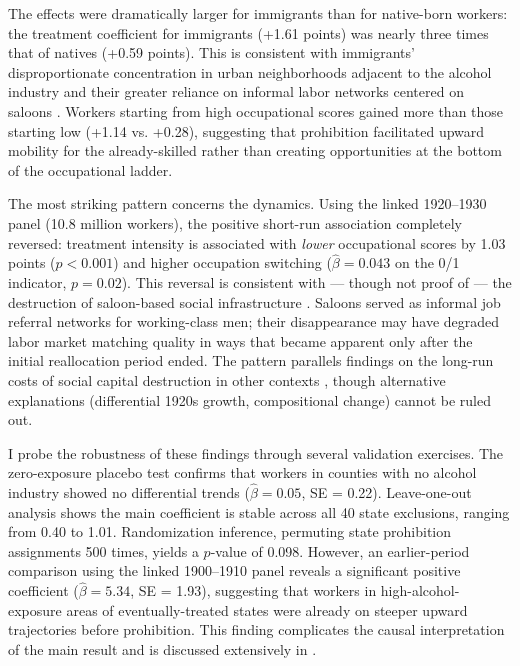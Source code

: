 \documentclass[12pt]{article}
\begin{document}
The effects were dramatically larger for immigrants than for native-born workers: the treatment coefficient for immigrants (+1.61 points) was nearly three times that of natives (+0.59 points). This is consistent with immigrants' disproportionate concentration in urban neighborhoods adjacent to the alcohol industry \citep{abramitzky2014} and their greater reliance on informal labor networks centered on saloons \citep{powers1998}. Workers starting from high occupational scores gained more than those starting low (+1.14 vs. +0.28), suggesting that prohibition facilitated upward mobility for the already-skilled rather than creating opportunities at the bottom of the occupational ladder.

The most striking pattern concerns the dynamics. Using the linked 1920--1930 panel (10.8 million workers), the positive short-run association completely reversed: treatment intensity is associated with \emph{lower} occupational scores by 1.03 points ($p < 0.001$) and higher occupation switching ($\hat{\beta} = 0.043$ on the 0/1 indicator, $p = 0.02$). This reversal is consistent with --- though not proof of --- the destruction of saloon-based social infrastructure \citep{powers1998, salinger1991}. Saloons served as informal job referral networks for working-class men; their disappearance may have degraded labor market matching quality in ways that became apparent only after the initial reallocation period ended. The pattern parallels findings on the long-run costs of social capital destruction in other contexts \citep{hornbeck2012, blanchard1992}, though alternative explanations (differential 1920s growth, compositional change) cannot be ruled out.

I probe the robustness of these findings through several validation exercises. The zero-exposure placebo test confirms that workers in counties with no alcohol industry showed no differential trends ($\hat{\beta} = 0.05$, SE = 0.22). Leave-one-out analysis shows the main coefficient is stable across all 40 state exclusions, ranging from 0.40 to 1.01. Randomization inference, permuting state prohibition assignments 500 times, yields a $p$-value of 0.098. However, an earlier-period comparison using the linked 1900--1910 panel reveals a significant positive coefficient ($\hat{\beta} = 5.34$, SE = 1.93), suggesting that workers in high-alcohol-exposure areas of eventually-treated states were already on steeper upward trajectories before prohibition. This finding complicates the causal interpretation of the main result and is discussed extensively in .
\end{document}
